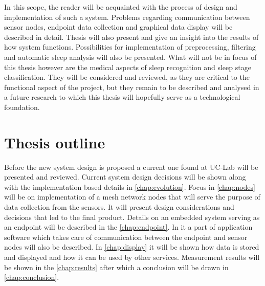 In this scope, the reader will be acquainted with the process of design and implementation of such a system. Problems regarding communication between sensor nodes, endpoint data collection and graphical data display will be described in detail. Thesis will also present and give an insight into the results of how system functions. Possibilities for implementation of preprocessing, filtering and automatic sleep analysis will also be presented. What will not be in focus of this thesis however are the medical aspects of sleep recognition and sleep stage classification. They will be considered and reviewed, as they are critical to the functional aspect of the project, but they remain to be described and analysed in a future research to which this thesis will hopefully serve as a technological foundation.


\section{Thesis outline}

Before the new system design is proposed a current one found at \ac{UC-Lab} will be presented and reviewed. Current system design decisions will be shown along with the implementation based details in \autoref{chap:evolution}. Focus in \autoref{chap:nodes} will be on implementation of a mesh network nodes that will serve the purpose of data collection from the sensors. It will present design considerations and decisions that led to the final product. Details on an embedded system serving as an endpoint will be described in the \autoref{chap:endpoint}. In it a part of application software which takes care of communication between the endpoint and sensor nodes will also be described. In \autoref{chap:display} it will be shown how data is stored and displayed and how it can be used by other services. Measurement results will be shown in the \autoref{chap:results} after which a conclusion will be drawn in \autoref{chap:conclusion}.